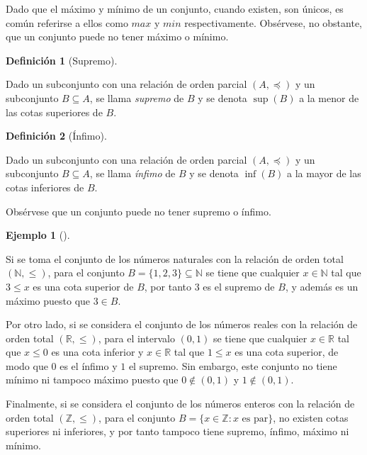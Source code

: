 \documentclass[
  a4paper,
]{scrreport}
\theoremstyle{definition}
\newtheorem{example}{Ejemplo}[chapter]
\theoremstyle{plain}
\theoremstyle{plain}
\theoremstyle{plain}
\theoremstyle{definition}
\newtheorem{definition}{Definición}[chapter]
\theoremstyle{remark}
\begin{document}
Dado que el máximo y mínimo de un conjunto, cuando existen, son únicos,
es común referirse a ellos como \(max\) y \(min\) respectivamente.
Obsérvese, no obstante, que un conjunto puede no tener máximo o mínimo.

\begin{definition}[Supremo]\protect\hypertarget{def-supremo-conjunto}{}\label{def-supremo-conjunto}

Dado un subconjunto con una relación de orden parcial \((A,\preceq)\) y
un subconjunto \(B\subseteq A\), se llama \emph{supremo} de \(B\) y se
denota \(\sup(B)\) a la menor de las cotas superiores de \(B\).

\end{definition}

\begin{definition}[Ínfimo]\protect\hypertarget{def-infimo-conjunto}{}\label{def-infimo-conjunto}

Dado un subconjunto con una relación de orden parcial \((A,\preceq)\) y
un subconjunto \(B\subseteq A\), se llama \emph{ínfimo} de \(B\) y se
denota \(\inf(B)\) a la mayor de las cotas inferiores de \(B\).

\end{definition}

Obsérvese que un conjunto puede no tener supremo o ínfimo.

\begin{example}[]\protect\hypertarget{exm-supremo-infimo-maximo-minimo}{}\label{exm-supremo-infimo-maximo-minimo}

Si se toma el conjunto de los números naturales con la relación de orden
total \((\mathbb{N},\leq)\), para el conjunto
\(B=\{1, 2, 3\}\subseteq \mathbb{N}\) se tiene que cualquier
\(x\in\mathbb{N}\) tal que \(3\leq x\) es una cota superior de \(B\),
por tanto \(3\) es el supremo de \(B\), y además es un máximo puesto que
\(3\in B\).

Por otro lado, si se considera el conjunto de los números reales con la
relación de orden total \((\mathbb{R},\leq)\), para el intervalo
\((0,1)\) se tiene que cualquier \(x\in\mathbb{R}\) tal que \(x\leq 0\)
es una cota inferior y \(x\in\mathbb{R}\) tal que \(1\leq x\) es una
cota superior, de modo que \(0\) es el ínfimo y \(1\) el supremo. Sin
embargo, este conjunto no tiene mínimo ni tampoco máximo puesto que
\(0\not\in (0,1)\) y \(1\not\in (0,1)\).

Finalmente, si se considera el conjunto de los números enteros con la
relación de orden total \((\mathbb{Z},\leq)\), para el conjunto
\(B=\{x\in\mathbb{Z}: x \mbox{ es par}\}\), no existen cotas superiores
ni inferiores, y por tanto tampoco tiene supremo, ínfimo, máximo ni
mínimo.

\end{example}
\end{document}
